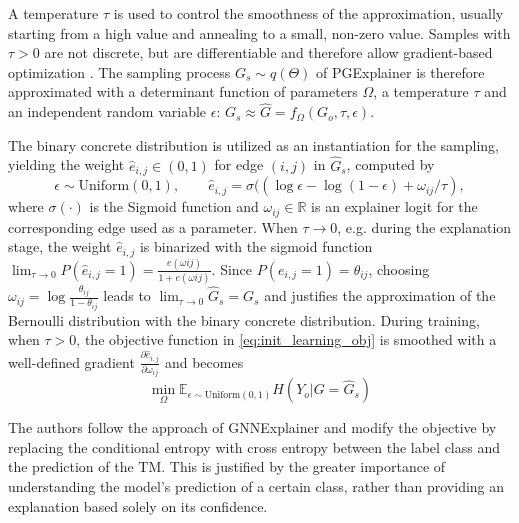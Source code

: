 A temperature $\tau$ is used to control the smoothness of the approximation, usually starting from a high value and annealing to a small, non-zero value. Samples with $\tau > 0$ are not discrete, but are differentiable and therefore allow gradient-based optimization \cite{abid2019concrete}. The sampling process $G_s \sim q(\Theta)$ of PGExplainer is therefore approximated with a determinant function of parameters $\Omega$, a temperature $\tau$ and an independent random variable $\epsilon$: $G_s \approx \hat{G}=f_\Omega(G_o,\tau,\epsilon)$. 

The binary concrete distribution \cite{maddison2016concrete} is utilized as an instantiation for the sampling, yielding the weight $\hat{e}_{i,j} \in (0,1)$ for edge $(i,j)$ in $\hat{G}_s$, computed by
\begin{equation}
    \label{eq:reparam_trick}
    \epsilon \sim \text{Uniform}(0,1), \qquad \hat{e}_{i,j}=\sigma((\log \epsilon - \log(1-\epsilon)+\omega_{ij}/\tau),
\end{equation}
where $\sigma(\cdot)$ is the Sigmoid function and $\omega_{ij} \in \mathbb{R}$ is an explainer logit for the corresponding edge used as a parameter. When $\tau \rightarrow 0$, e.g. during the explanation stage, the weight $\hat{e}_{i,j}$ is binarized with the sigmoid function $\lim_{\tau\rightarrow 0}P(\hat{e}_{i,j} = 1) = \frac{e(\omega{ij})}{1+e(\omega{ij})}$. Since $P(e_{i,j} = 1) = \theta_{ij}$, choosing $\omega_{ij} = \log\frac{\theta_{ij}}{1-\theta_{ij}}$ leads to $\lim_{\tau\rightarrow 0}\hat{G}_s = G_s$ and justifies the approximation of the Bernoulli distribution with the binary concrete distribution. During training, when $\tau > 0$, the objective function in \eqref{eq:init_learning_obj} is smoothed with a well-defined gradient $\frac{\partial\hat{e}_{i,j}}{\partial\omega_{ij}}$ and becomes
\begin{equation}
    \min_\Omega \mathbb{E}_{\epsilon \sim \text{Uniform}(0,1)}H(Y_o| G = \hat{G}_s)
\end{equation}

The authors follow the approach of GNNExplainer \cite{ying2019gnnexplainer} and modify the objective by replacing the conditional entropy with cross entropy between the label class and the prediction of the \ac{TM}. This is justified by the greater importance of understanding the model's prediction of a certain class, rather than providing an explanation based solely on its confidence.

